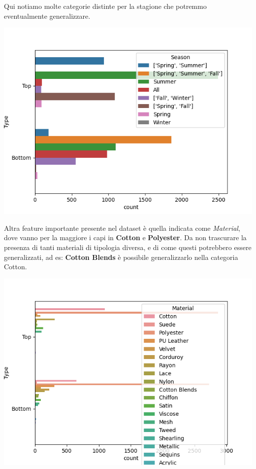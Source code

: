 \documentclass[a4paper, 11pt, oneside]{report}
\begin{document}
                Qui notiamo molte categorie distinte per la stagione che potremmo eventualmente generalizzare.
                \begin{center}
                    \includegraphics[scale=0.4]{countSeasonTopBottom}
                \end{center}
                \newpage
                \par \noindent Altra feature importante presente nel dataset è quella indicata come \textit{Material},
                dove vanno per la maggiore i capi in \textbf{Cotton} e \textbf{Polyester}. Da non trascurare la presenza
                di tanti materiali di tipologia diversa, e di come questi potrebbero essere generalizzati, ad es: \textbf{Cotton Blends}
                è possibile generalizzarlo nella categoria Cotton.
                \begin{center}
                    \includegraphics[scale=0.4]{countMaterialTopBottom}
                \end{center}
\end{document}
